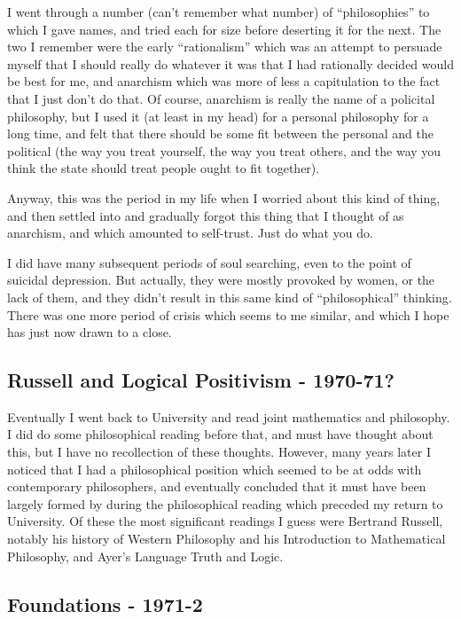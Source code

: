 \documentclass{rbjk}
\begin{document}
\begin{article}
I went through a number (can't remember what number) of ``philosophies'' to which I gave names, and tried each for size before deserting it for the next.
The two I remember were the early ``rationalism'' which was an attempt to persuade myself that I should really do whatever it was that I had rationally decided would be best for me, and anarchism which was more of less a capitulation to the fact that I just don't do that.
Of course, anarchism is really the name of a policital philosophy, but I used it (at least in my head) for a personal philosophy for a long time, and felt that there should be some fit between the personal and the political (the way you treat yourself, the way you treat others, and the way you think the state should treat people ought to fit together).

Anyway, this was the period in my life when I worried about this kind of thing, and then settled into and gradually forgot this thing that I thought of as anarchism, and which amounted to self-trust.
Just do what you do.

I did have many subsequent periods of soul searching, even to the point of suicidal depression.
But actually, they were mostly provoked by women, or the lack of them, and they didn't result in this same kind of ``philosophical'' thinking.
There was one more period of crisis which seems to me similar, and which I hope has just now drawn to a close.

\subsection{Russell and Logical Positivism - 1970-71?}

Eventually I went back to University and read joint mathematics and philosophy.
I did do some philosophical reading before that, and must have thought about this, but I have no recollection of these thoughts.
However, many years later I noticed that I had a philosophical position which seemed to be at odds with contemporary philosophers, and eventually concluded that it must have been largely formed by during the philosophical reading which preceded my return to University.
Of these the most significant readings I guess were Bertrand Russell, notably his history of Western Philosophy and his Introduction to Mathematical Philosophy, and Ayer's Language Truth and Logic.

\subsection{Foundations - 1971-2}


\end{article}
\end{document}
